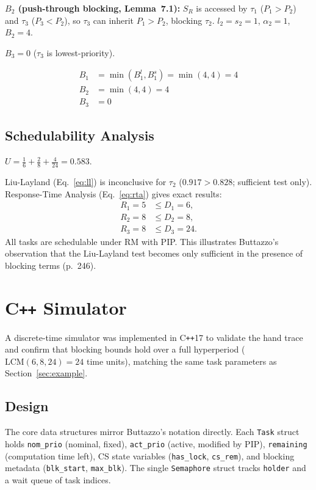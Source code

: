 \documentclass[conference]{IEEEtran}
\begin{document}
\noindent\textbf{$B_2$ (push-through blocking, Lemma~7.1):}
$S_R$ is accessed by $\tau_1$ ($P_1 > P_2$) and $\tau_3$ ($P_3 < P_2$),
so $\tau_3$ can inherit $P_1 > P_2$, blocking $\tau_2$.
$l_2 = s_2 = 1$, $\alpha_2 = 1$, $B_2 = 4$.

\noindent\textbf{$B_3 = 0$} ($\tau_3$ is lowest-priority).

\begin{align*}
  B_1 &= \min(B_1^l, B_1^s) = \min(4, 4) = 4 \\
  B_2 &= \min(4, 4) = 4 \\
  B_3 &= 0
\end{align*}

\subsection{Schedulability Analysis}

$U = \tfrac{1}{6} + \tfrac{2}{8} + \tfrac{4}{24} = 0.583$.

Liu-Layland (Eq.~\ref{eq:ll}) is inconclusive for $\tau_2$
($0.917 > 0.828$; sufficient test only).
Response-Time Analysis (Eq.~\ref{eq:rta}) gives exact results:
\begin{align*}
  R_1 = 5 &\leq D_1 = 6,\\
  R_2 = 8 &\leq D_2 = 8,\\
  R_3 = 8 &\leq D_3 = 24.
\end{align*}
All tasks are schedulable under RM with PIP.
This illustrates Buttazzo's observation that the Liu-Layland test
becomes only sufficient in the presence of blocking terms (p.~246).

\section{C\texttt{++} Simulator}
\label{sec:impl}

A discrete-time simulator was implemented in C\texttt{++}17 to
validate the hand trace and confirm that blocking bounds hold
over a full hyperperiod ($\mathrm{LCM}(6,8,24){=}24$ time units),
matching the same task parameters as Section~\ref{sec:example}.

\subsection{Design}

The core data structures mirror Buttazzo's notation directly.
Each \texttt{Task} struct holds \texttt{nom\_prio} (nominal, fixed),
\texttt{act\_prio} (active, modified by PIP), \texttt{remaining}
(computation time left), CS state variables (\texttt{has\_lock},
\texttt{cs\_rem}), and blocking metadata (\texttt{blk\_start},
\texttt{max\_blk}).
The single \texttt{Semaphore} struct tracks \texttt{holder} and
a wait queue of task indices.
\end{document}
